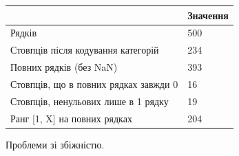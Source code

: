 \begingroup\fontsize{7.5}{9.5}\selectfont\setlength{\tabcolsep}{2.5mm}\renewcommand{\arraystretch}{1.15}
\par\vspace{2pt}\noindent\begin{tabular}{|ll|}
\hline
 & Значення \\
\hline
Рядків & 500 \\
Стовпців після кодування категорій & 234 \\
Повних рядків (без NaN) & 393 \\
Стовпців, що в повних рядках завжди 0 & 16 \\
Стовпців, ненульових лише в 1 рядку & 19 \\
Ранг [1, X] на повних рядках & 204 \\
\hline
\end{tabular}\par\vspace{2pt}
\endgroup


\answerheading
Проблеми зі збіжністю.

